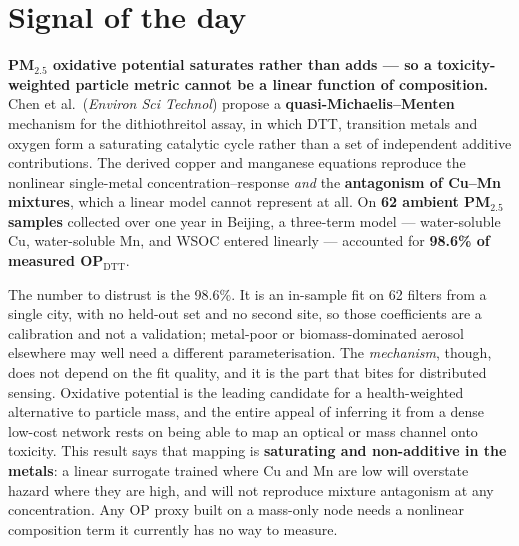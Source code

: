 \documentclass[10pt]{article}
\begin{document}
\vspace{6mm}

\section*{\sffamily\bfseries\color{Deep}Signal of the day}
\vspace{-1.5mm}{\color{Amber}\rule{\linewidth}{1.1pt}}\vspace{2.5mm}

\begin{keybox}
{\sffamily\bfseries\small\color{Deep}PM$_{2.5}$ oxidative potential saturates rather than
adds --- so a toxicity-weighted particle metric cannot be a linear function of composition.}\\[1.4mm]
\footnotesize
Chen et al.\ (\textit{Environ Sci Technol}) propose a \textbf{quasi-Michaelis--Menten}
mechanism for the dithiothreitol assay, in which DTT, transition metals and oxygen form a
saturating catalytic cycle rather than a set of independent additive contributions. The
derived copper and manganese equations reproduce the nonlinear single-metal
concentration--response \textit{and} the \textbf{antagonism of Cu--Mn mixtures}, which a
linear model cannot represent at all. On \textbf{62 ambient PM$_{2.5}$ samples} collected
over one year in Beijing, a three-term model --- water-soluble Cu, water-soluble Mn, and
WSOC entered linearly --- accounted for \textbf{98.6\% of measured OP$_{\mathrm{DTT}}$}.

The number to distrust is the 98.6\%. It is an in-sample fit on 62 filters from a single
city, with no held-out set and no second site, so those coefficients are a calibration and
not a validation; metal-poor or biomass-dominated aerosol elsewhere may well need a
different parameterisation. The \textit{mechanism}, though, does not depend on the fit
quality, and it is the part that bites for distributed sensing. Oxidative potential is the
leading candidate for a health-weighted alternative to particle mass, and the entire
appeal of inferring it from a dense low-cost network rests on being able to map an optical
or mass channel onto toxicity. This result says that mapping is \textbf{saturating and
non-additive in the metals}: a linear surrogate trained where Cu and Mn are low will
overstate hazard where they are high, and will not reproduce mixture antagonism at any
concentration. Any OP proxy built on a mass-only node needs a nonlinear composition term
it currently has no way to measure.
\end{keybox}
\end{document}
